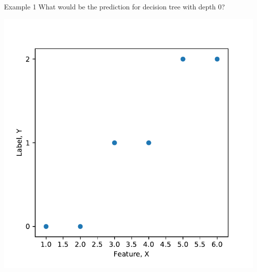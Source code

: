 \documentclass{beamer}
\begin{document}
\begin{frame}{Example 1}
What would be the prediction for decision tree with depth 0?
\begin{center}
\includegraphics[scale=0.5]{decision-trees-regression/imgs/dataset}
\end{center}
\end{frame}
\end{document}
